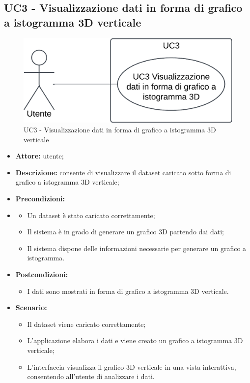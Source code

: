 \subsection{UC3 - Visualizzazione dati in forma di grafico a istogramma 3D verticale}
\begin{figure}[h!]
    \centering
    \includegraphics[scale=0.7]{template/images/UC3.png}
    \caption{UC3 - Visualizzazione dati in forma di grafico a istogramma 3D verticale}
\end{figure}
\begin{itemize}
    \item \textbf{Attore:} utente;
    \item \textbf{Descrizione:} consente di visualizzare il dataset caricato sotto forma di grafico a istogramma 3D verticale;
    \item \textbf{Precondizioni:}
    \item \begin{itemize}
        \item Un dataset è stato caricato correttamente;
        \item Il sistema è in grado di generare un grafico 3D partendo dai dati;
        \item Il sistema dispone delle informazioni necessarie per generare un grafico a istogramma.
    \end{itemize}
    \item \textbf{Postcondizioni:}
    \begin{itemize}
        \item I dati sono mostrati in forma di grafico a istogramma 3D verticale.
    \end{itemize}
    \item \textbf{Scenario:}
    \begin{itemize}
        \item Il dataset viene caricato correttamente;
        \item L'applicazione elabora i dati e viene creato un grafico a istogramma 3D verticale;
        \item L'interfaccia visualizza il grafico 3D verticale in una vista interattiva, consentendo all'utente di analizzare i dati.
    \end{itemize}
\end{itemize}
